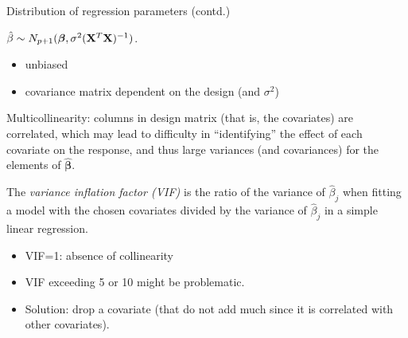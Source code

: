 \documentclass[ignorenonframetext,]{beamer}
\providecommand{\tightlist}{%
  \setlength{\itemsep}{0pt}\setlength{\parskip}{0pt}}
\begin{document}
\begin{frame}

\begin{block}{Distribution of regression parameters (contd.)}

\(\hat{\beta}\sim N_{p+1}(\boldsymbol{\beta},\sigma^2({\bf X}^T{\bf X})^{-1})\).

\begin{itemize}
\tightlist
\item
  unbiased
\item
  covariance matrix dependent on the design (and \(\sigma^2\))
\end{itemize}

Multicollinearity: columns in design matrix (that is, the covariates)
are correlated, which may lead to difficulty in ``identifying'' the
effect of each covariate on the response, and thus large variances (and
covariances) for the elements of \(\hat{\boldsymbol\beta}\).

The \emph{variance inflation factor (VIF)} is the ratio of the variance
of \(\hat{\beta}_j\) when fitting a model with the chosen covariates
divided by the variance of \(\hat{\beta}_j\) in a simple linear
regression.

\begin{itemize}
\tightlist
\item
  VIF=1: absence of collinearity
\item
  VIF exceeding 5 or 10 might be problematic.
\item
  Solution: drop a covariate (that do not add much since it is
  correlated with other covariates).
\end{itemize}

\end{block}

\end{frame}
\end{document}
